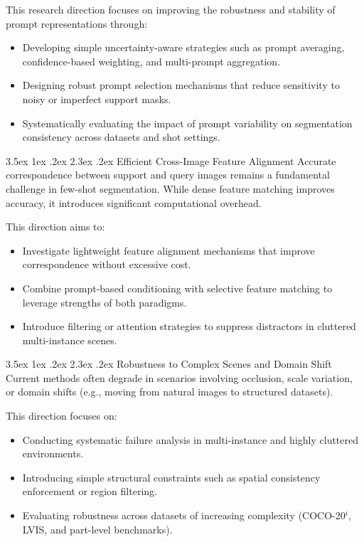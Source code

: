 \documentclass[journal,12pt,onecolumn,draftclsnofoot]{IEEEtran}
\makeatletter
\renewcommand{\section}{\@startsection{section}{1}{\z@}%
    {3.5ex \@plus 1ex \@minus .2ex}%
    {2.3ex \@plus.2ex}%
    {\normalfont\Large\bfseries}}
\makeatother
\begin{document}
This research direction focuses on improving the robustness and stability of prompt representations through:
\begin{itemize}
    \item Developing simple uncertainty-aware strategies such as prompt averaging, confidence-based weighting, and multi-prompt aggregation.
    \item Designing robust prompt selection mechanisms that reduce sensitivity to noisy or imperfect support masks.
    \item Systematically evaluating the impact of prompt variability on segmentation consistency across datasets and shot settings.
\end{itemize}

\section{Efficient Cross-Image Feature Alignment}
Accurate correspondence between support and query images remains a fundamental challenge in few-shot segmentation. While dense feature matching improves accuracy, it introduces significant computational overhead.

This direction aims to:
\begin{itemize}
    \item Investigate lightweight feature alignment mechanisms that improve correspondence without excessive cost.
    \item Combine prompt-based conditioning with selective feature matching to leverage strengths of both paradigms.
    \item Introduce filtering or attention strategies to suppress distractors in cluttered multi-instance scenes.
\end{itemize}

\section{Robustness to Complex Scenes and Domain Shift}
Current methods often degrade in scenarios involving occlusion, scale variation, or domain shifts (e.g., moving from natural images to structured datasets).

This direction focuses on:
\begin{itemize}
    \item Conducting systematic failure analysis in multi-instance and highly cluttered environments.
    \item Introducing simple structural constraints such as spatial consistency enforcement or region filtering.
    \item Evaluating robustness across datasets of increasing complexity (COCO-20$^i$, LVIS, and part-level benchmarks).
\end{itemize}
\end{document}
